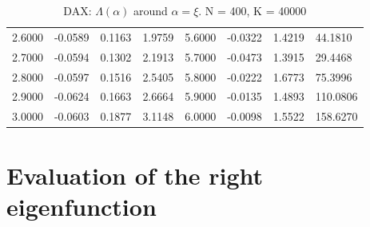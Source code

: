 \documentclass[aoas,preprint]{imsart}
\numberwithin{equation}{section}
\theoremstyle{plain}
\begin{document}
\begin{itemize}
\begin{table}[htb!]
\begin{tabular}{l|l|l|l||l|l|l|l}
      2.6000 & -0.0589 & 0.1163 & 1.9759 & 5.6000 & -0.0322 & 1.4219 & 44.1810 \\
      2.7000 & -0.0594 & 0.1302 & 2.1913 & 5.7000 & -0.0473 & 1.3915 & 29.4468 \\
      2.8000 & -0.0597 & 0.1516 & 2.5405 & 5.8000 & -0.0222 & 1.6773 & 75.3996 \\
      2.9000 & -0.0624 & 0.1663 & 2.6664 & 5.9000 & -0.0135 & 1.4893 & 110.0806 \\
      3.0000 & -0.0603 & 0.1877 & 3.1148 & 6.0000 & -0.0098 & 1.5522 & 158.6270
    \end{tabular}
    \caption{DAX: $\Lambda(\alpha)$ around $\alpha = \xi$. N = 400, K = 40000}
    \label{tab:DAX_garch21_tail_index}
  \end{table}



\end{itemize}

\section{Evaluation of the right eigenfunction}
\end{document}
